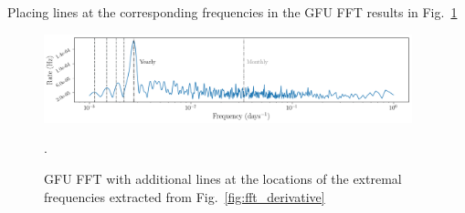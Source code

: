 Placing lines at the corresponding frequencies in the GFU FFT results in Fig.~\ref{fig:gfu_with_harmonics}

\begin{figure}
    \centering
    \includegraphics[width=0.95\textwidth]{images/gfu_with_correct_harmonics.png}
    \caption{GFU FFT with additional lines at the locations of the extremal frequencies extracted from Fig.~\ref{fig:fft_derivative}}.
    \label{fig:gfu_with_harmonics}
\end{figure}